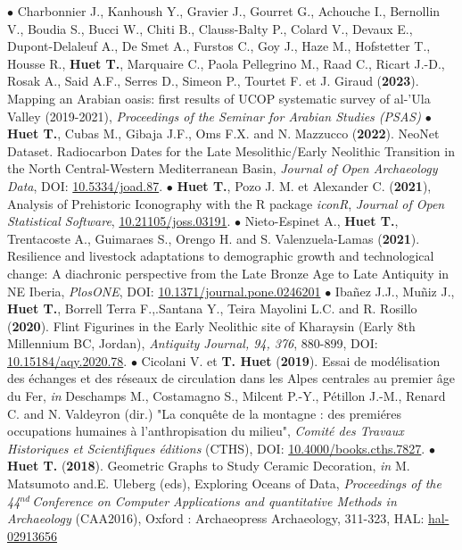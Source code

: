 \documentclass{article}
\begin{document}
\smallbreak
$\bullet$ Charbonnier J., Kanhoush Y., Gravier J., Gourret G., Achouche I., Bernollin V., Boudia S., Bucci W., Chiti B., Clauss-Balty P., Colard V., Devaux E., Dupont-Delaleuf A., De Smet A., Furstos C., Goy J., Haze M., Hofstetter T., Housse R., \textbf{Huet T.}, Marquaire C., Paola Pellegrino M., Raad C., Ricart J.-D., Rosak A., Said A.F., Serres D., Simeon P., Tourtet F. et J. Giraud (\textbf{2023}). Mapping an Arabian oasis: first results of UCOP systematic survey of al-'Ula Valley (2019-2021), \textit{Proceedings of the Seminar for Arabian Studies (PSAS)}
\smallbreak
$\bullet$ \textbf{Huet T.}, Cubas M., Gibaja J.F., Oms F.X. and N. Mazzucco (\textbf{2022}). NeoNet Dataset. Radiocarbon Dates for the Late Mesolithic/Early Neolithic Transition in the North Central-Western Mediterranean Basin, \textit{Journal of Open Archaeology Data}, DOI: \href{http://doi.org/10.5334/joad.87}{10.5334/joad.87}.
\smallbreak
$\bullet$ \textbf{Huet T.}, Pozo J. M. et Alexander C. (\textbf{2021}), Analysis of Prehistoric Iconography with the R package \textit{iconR}, \textit{Journal of Open Statistical Software}, \href{https://joss.theoj.org/papers/10.21105/joss.03191}{10.21105/joss.03191}.
\smallbreak
$\bullet$ Nieto-Espinet A., \textbf{Huet T.}, Trentacoste A., Guimaraes S., Orengo H. and S. Valenzuela-Lamas (\textbf{2021}). Resilience and livestock adaptations to demographic growth and technological change: A diachronic perspective from the Late Bronze Age to Late Antiquity in NE Iberia, \textit{PlosONE}, DOI: \href{https://doi.org/10.1371/journal.pone.0246201}{10.1371/journal.pone.0246201}
\smallbreak
$\bullet$ Iba\~{n}ez J.J., Mu\~{n}iz J., \textbf{Huet T.}, Borrell Terra F.,.Santana Y., Teira Mayolini L.C. and R. Rosillo (\textbf{2020}). Flint Figurines in the Early Neolithic site of Kharaysin (Early 8th Millennium BC, Jordan), \textit{Antiquity Journal, 94, 376}, 880-899, DOI: \href{https://doi.org/10.15184/aqy.2020.78}{10.15184/aqy.2020.78}.
\smallbreak
$\bullet$ Cicolani V. et \textbf{T. Huet} (\textbf{2019}). Essai de mod\'{e}lisation des \'{e}changes et des r\'{e}seaux de circulation dans les Alpes centrales au premier \^{a}ge du Fer, \textit{in} Deschamps M., Costamagno S., Milcent P.-Y., Pétillon J.-M., Renard C. and N. Valdeyron (dir.) "La conqu\^{e}te de la montagne : des premi\'{e}res occupations humaines \`{a} l'anthropisation du milieu", \textit{Comit\'{e} des Travaux Historiques et Scientifiques \'{e}ditions} (CTHS), DOI: \href{https://books.openedition.org/cths/7827}{10.4000/books.cths.7827}.
\smallbreak
$\bullet$ \textbf{Huet T.} (\textbf{2018}). Geometric Graphs to Study Ceramic Decoration, \textit{in} M. Matsumoto and.E. Uleberg (eds), Exploring Oceans of Data, \textit{Proceedings of the 44${}^{nd\ }$Conference on Computer Applications and quantitative Methods in Archaeology} (CAA2016), Oxford : Archaeopress Archaeology, 311-323, HAL: \href{https://hal.archives-ouvertes.fr/hal-02913656}{hal-02913656}
\end{document}
